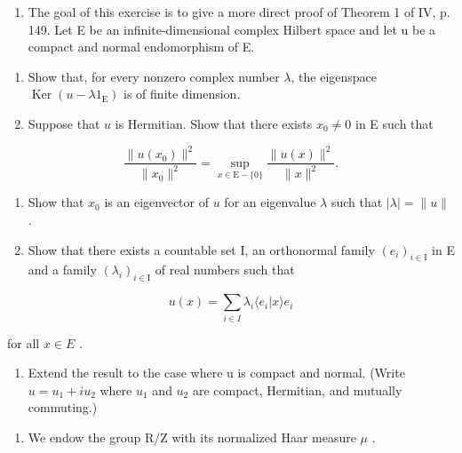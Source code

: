 \begin{enumerate}
\def\labelenumi{\arabic{enumi})}
\setcounter{enumi}{6}
\tightlist
\item
  The goal of this exercise is to give a more direct proof of Theorem 1 of IV, p. 149. Let E be an infinite-dimensional complex Hilbert space and let u be a compact and normal endomorphism of E.
\end{enumerate}

\begin{enumerate}
\def\labelenumi{\alph{enumi})}
\item
  Show that, for every nonzero complex number \(\lambda\), the eigenspace \(\operatorname{Ker}(u - \lambda 1_{\mathrm{E}})\) is of finite dimension.
\item
  Suppose that \(u\) is Hermitian. Show that there exists \(x_0 \neq 0\) in E such that
\end{enumerate}

\[
\frac {\| u (x _ {0}) \| ^ {2}}{\| x _ {0} \| ^ {2}} = \sup _ {x \in \mathrm{E} - \{0 \}} \frac {\| u (x) \| ^ {2}}{\| x \| ^ {2}}.
\]

\begin{enumerate}
\def\labelenumi{\alph{enumi})}
\setcounter{enumi}{2}
\item
  Show that \(x_{0}\) is an eigenvector of \(u\) for an eigenvalue \(\lambda\) such that \(|\lambda| = \|u\|\) .
\item
  Show that there exists a countable set I, an orthonormal family \((e_{i})_{i\in\mathrm{I}}\) in E and a family \((\lambda_{i})_{i\in\mathrm{I}}\) of real numbers such that
\end{enumerate}

\[
u (x) = \sum_ {i \in I} \lambda_ {i} \langle e _ {i} | x \rangle e _ {i}
\]

for all \(x \in E\) .

\begin{enumerate}
\def\labelenumi{\alph{enumi})}
\setcounter{enumi}{4}
\tightlist
\item
  Extend the result to the case where u is compact and normal. (Write \(u = u_{1} + iu_{2}\) where \(u_{1}\) and \(u_{2}\) are compact, Hermitian, and mutually commuting.)
\end{enumerate}

\begin{enumerate}
\def\labelenumi{\arabic{enumi})}
\setcounter{enumi}{7}
\tightlist
\item
  We endow the group R/Z with its normalized Haar measure \(\mu\) .
\end{enumerate}

